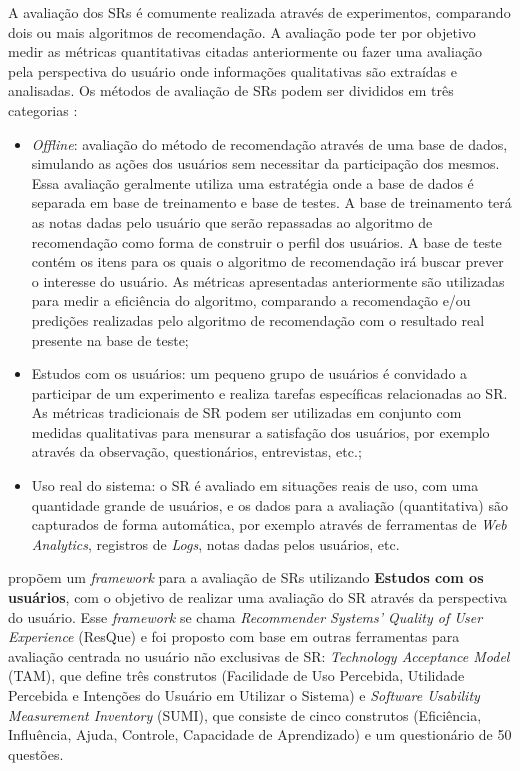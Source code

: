 A avaliação dos SRs é comumente realizada através de experimentos, comparando dois ou mais algoritmos de recomendação. A
avaliação pode ter por objetivo medir as métricas quantitativas citadas anteriormente ou fazer uma avaliação pela
perspectiva do usuário onde informações qualitativas são extraídas e analisadas. Os métodos de avaliação de SRs podem ser
divididos em três categorias \cite{shani2011evaluating}:

\begin{itemize}
\item \textit{Offline}: avaliação do método de recomendação através de uma base de dados, simulando as ações
dos usuários sem necessitar da participação dos mesmos. Essa avaliação geralmente utiliza uma estratégia onde a base de dados
é separada em base de treinamento e base de testes. A base de treinamento terá as notas dadas pelo usuário que serão
repassadas ao algoritmo de recomendação como forma de construir o perfil dos usuários. A base de teste contém os itens para os
quais o algoritmo de recomendação irá buscar prever o interesse do usuário. As métricas apresentadas anteriormente são
utilizadas para medir a eficiência do algoritmo, comparando a recomendação e/ou predições realizadas pelo algoritmo de
recomendação com o resultado real presente na base de teste;
\item Estudos com os usuários: um pequeno grupo de usuários é convidado a participar de um experimento e realiza
tarefas específicas relacionadas ao SR. As métricas tradicionais de SR podem ser utilizadas em conjunto com medidas
qualitativas para mensurar a satisfação dos usuários, por exemplo através da observação, questionários, entrevistas, etc.;
\item Uso real do sistema: o SR é avaliado em situações reais de uso, com uma quantidade grande de usuários, e
os dados para a avaliação (quantitativa) são capturados de forma automática, por exemplo através de ferramentas de
\textit{Web Analytics}, registros de \textit{Logs}, notas dadas pelos usuários, etc.
\end{itemize}

 propõem um \textit{framework} para a avaliação de SRs utilizando \textbf{Estudos com os usuários}, com o objetivo
de realizar uma avaliação do SR através da perspectiva do usuário. Esse \textit{framework} se chama \textit{Recommender
Systems' Quality of User Experience}  (ResQue) e foi proposto com base em outras ferramentas para avaliação centrada no
usuário não exclusivas de SR: \textit{Technology Acceptance Model} (TAM), que define três construtos (Facilidade de Uso
Percebida, Utilidade Percebida e Intenções do Usuário em Utilizar o Sistema) e \textit{Software Usability Measurement
Inventory} (SUMI), que consiste de cinco construtos (Eficiência, Influência, Ajuda, Controle, Capacidade de Aprendizado)
e um questionário de 50 questões.

